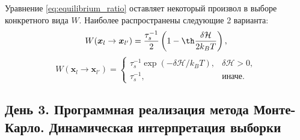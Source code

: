 \documentclass[article]{ncc}
\renewcommand{\vec}[1]{\boldsymbol{#1}}
\begin{document}
Уравнение \ref{eq:equilibrium_ratio} оставляет некоторый произвол в выборе конкретного вида \( W \). Наиболее распространены следующие 2 варианта:
\begin{equation}
    W(\vec{x}_l \to \vec{x}_{l'}) = \frac{\tau_s^{-1}}{2}\left(1-\th\frac{\delta\mathcal{H}}{2k_BT}\right),
\end{equation}
\begin{equation}
    W(\vec{x}_l \to \vec{x}_{l'}) = \left\{
        \begin{array}{ll}
            \tau_s^{-1}\exp(-\delta\mathcal{H}/k_BT),& \delta\mathcal{H}>0,\\
            \tau_s^{-1}, & \text{иначе}.
        \end{array}
    \right.
\end{equation}

\subsection{День 3. Программная реализация метода Монте-Карло. Динамическая интерпретация выборки}
\end{document}
